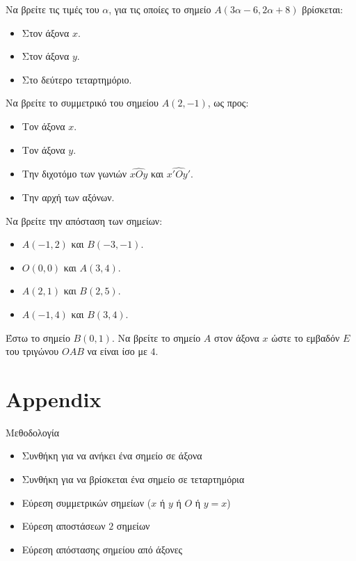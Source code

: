 \documentclass{presentation}
\begin{document}
\exercises

\begin{askisi}
  Να βρείτε τις τιμές του $α$, για τις οποίες το σημείο $Α(3α-6,2α+8)$ βρίσκεται:
  \begin{itemize}
    \item Στον άξονα $x$.
    \item Στον άξονα $y$.
    \item Στο δεύτερο τεταρτημόριο.
  \end{itemize}
\end{askisi}

\begin{askisi}
  Να βρείτε το συμμετρικό του σημείου $A(2,-1)$, ως προς:
  \begin{itemize}
    \item Τον άξονα $x$.
    \item Τον άξονα $y$.
    \item Την διχοτόμο των γωνιών $\widehat{xOy}$ και $\widehat{x'Oy'}$.
    \item Την αρχή των αξόνων.
  \end{itemize}
\end{askisi}

\begin{askisi}
  Να βρείτε την απόσταση των σημείων:
  \begin{itemize}
    \item $A(-1,2)$ και $B(-3,-1)$.
    \item $Ο(0,0)$ και $A(3,4)$.
    \item $A(2,1)$ και $B(2,5)$.
    \item $A(-1,4)$ και $B(3,4)$.
  \end{itemize}
\end{askisi}

\begin{askisi}
  Έστω το σημείο $Β(0,1)$. Να βρείτε το σημείο $A$ στον άξονα $x$ ώστε το εμβαδόν $Ε$ του τριγώνου $OAB$ να είναι ίσο με $4$.
\end{askisi}

\section{Appendix}

\begin{frame}{Μεθοδολογία}
  \begin{itemize}
    \item Συνθήκη για να ανήκει ένα σημείο σε άξονα
    \item Συνθήκη για να βρίσκεται ένα σημείο σε τεταρτημόρια
    \item Εύρεση συμμετρικών σημείων ($x$ ή $y$ ή $O$ ή $y=x$)
    \item Εύρεση αποστάσεων $2$ σημείων
    \item Εύρεση απόστασης σημείου από άξονες
  \end{itemize}
\end{frame}
\end{document}
